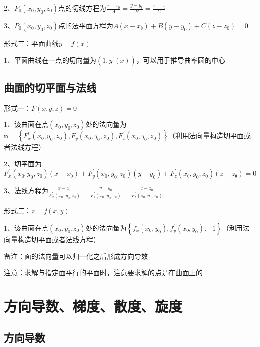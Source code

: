 2、$ P_{0}\left(x_{0}, y_{0}, z_{0}\right) $点的切线方程为$ \frac{x-x_{0}}{A}=\frac{y-y_{0}}{B}=\frac{z-z_{0}}{C} $

3、$ P_{0}\left(x_{0}, y_{0}, z_{0}\right) $点的法平面方程为$ A\left(x-x_{0}\right)+B\left(y-y_{0}\right)+C\left(z-z_{0}\right)=0 $

形式三：平面曲线$ y=f(x) $

1、平面曲线在一点的切向量为$ (1,y^{\prime}(x)) $，可以用于推导曲率圆的中心



\subsection{曲面的切平面与法线}

形式一：$ F(x, y, z)=0 $

1、该曲面在点$ \left(x_{0}, y_{0}, z_{0}\right) $处的法向量为$ \boldsymbol{n}=\left\{F_{x}^{\prime}\left(x_{0}, y_{0}, z_{0}\right), F_{y}^{\prime}\left(x_{0}, y_{0}, z_{0}\right), F_{z}^{\prime}\left(x_{0}, y_{0}, z_{0}\right)\right\} $（利用法向量构造切平面或者法线方程）

2、切平面为$ F_{x}^{\prime}\left(x_{0}, y_{0}, z_{0}\right)\left(x-x_{0}\right)+F_{y}^{\prime}\left(x_{0}, y_{0}, z_{0}\right)\left(y-y_{0}\right)+F_{z}^{\prime}\left(x_{0}, y_{0}, z_{0}\right)\left(z-z_{0}\right)=0  $

3、法线方程为$ \frac{x-x_{0}}{F_{x}^{\prime}\left(x_{0}, y_{0}, z_{0}\right)}=\frac{y-y_{0}}{F_{y}^{\prime}\left(x_{0}, y_{0}, z_{0}\right)}=\frac{z-z_{0}}{F_{z}^{\prime}\left(x_{0}, y_{0}, z_{0}\right)} $

形式二：$ z=f(x, y) $

1、该曲面在点$ \left(x_{0}, y_{0}, z_{0}\right) $处的法向量为$ \left\{f_{x}^{\prime}\left(x_{0}, y_{0}\right),f_{y}^{\prime}\left(x_{0}, y_{0}\right),-1\right\} $（利用法向量构造切平面或者法线方程）

备注：面的法向量可以归一化之后形成方向导数

注意：求解与指定面平行的平面时，注意要求解的点是在曲面上的



\section{方向导数、梯度、散度、旋度}



\subsection{方向导数}

